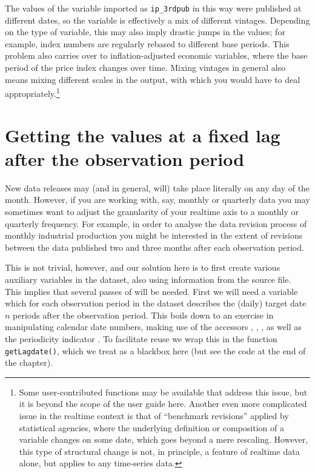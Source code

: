 The values of the variable imported as \texttt{ip\_3rdpub} in this way
were published at different dates, so the variable is effectively a
mix of different vintages. Depending on the type of variable, this may
also imply drastic jumps in the values; for example, index numbers are
regularly rebased to different base periods. This problem also carries
over to inflation-adjusted economic variables, where the base period
of the price index changes over time. Mixing vintages in general also
means mixing different scales in the output, with which you would have
to deal appropriately.\footnote{Some user-contributed functions may be
  available that address this issue, but it is beyond the scope of the
  user guide here. Another even more complicated issue in the realtime
  context is that of ``benchmark revisions'' applied by statistical
  agencies, where the underlying definition or composition of a
  variable changes on some date, which goes beyond a mere
  rescaling. However, this type of structural change is not, in
  principle, a feature of realtime data alone, but applies to any
  time-series data.}


\section{Getting the values at a fixed lag after the observation
  period}

New data releases may (and in general, will) take place literally on
any day of the month. However, if you are working with, say, monthly
or quarterly data you may sometimes want to adjust the granularity of
your realtime axis to a monthly or quarterly frequency. For example,
in order to analyse the data revision process of monthly industrial
production you might be interested in the extent of revisions between
the data published two and three months after each observation period.

This is not trivial, however, and our solution here is to first create
various auxiliary variables in the  dataset, also using
information from the source file. This implies that several passes of
 will be needed. First we will need a variable which for
each observation period in the dataset describes the (daily) target
date $n$ periods after the observation period. This boils down to an
exercise in manipulating calendar date numbers, making use of the
 accessors , ,
, as well as the periodicity indicator .
To facilitate reuse we wrap this in the function
\texttt{getLagdate()}, which we treat as a blackbox here (but see the
code at the end of the chapter).

